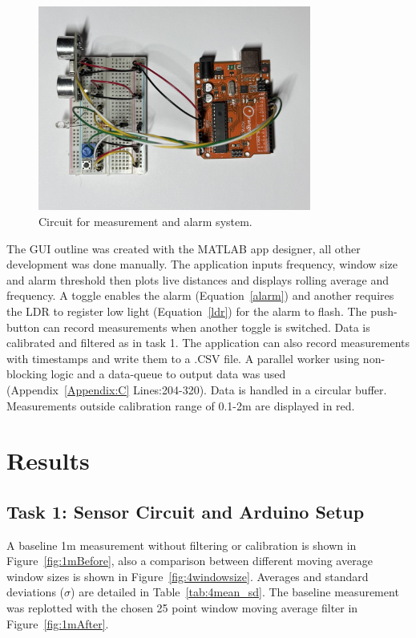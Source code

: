 \documentclass[a4paper,12pt]{article}
\begin{document}
\begin{figure}[htbp]
    \centering
    \includegraphics[width=0.8\textwidth]{figs/IMG_3416.JPEG}
    \caption{Circuit for measurement and alarm system.}
    \label{fig:task3circuitPic}
\end{figure}

The GUI outline was created with the MATLAB app designer, all other development was done manually. The application inputs frequency, window size and alarm threshold then plots live distances and displays rolling average and frequency. A toggle enables the alarm (Equation~\ref{alarm}) and another requires the LDR to register low light (Equation~\ref{ldr}) for the alarm to flash. The push-button can record measurements when another toggle is switched. Data is calibrated and filtered as in task 1. The application can also record measurements with timestamps and write them to a .CSV file. A parallel worker using non-blocking logic and a data-queue to output data was used (Appendix~\ref{Appendix:C} Lines:204-320). Data is handled in a circular buffer. Measurements outside calibration range of 0.1-2m are displayed in red.



\break

\section{Results}

\subsection{Task 1: Sensor Circuit and Arduino Setup}
A baseline 1m measurement without filtering or calibration is shown in Figure~\ref{fig:1mBefore}, also a comparison between different moving average window sizes is shown in Figure~\ref{fig:4windowsize}. Averages and standard deviations ($\sigma$) are detailed in Table~\ref{tab:4mean_sd}. The baseline measurement was replotted with the chosen 25 point window moving average filter in  Figure~\ref{fig:1mAfter}.
\end{document}

